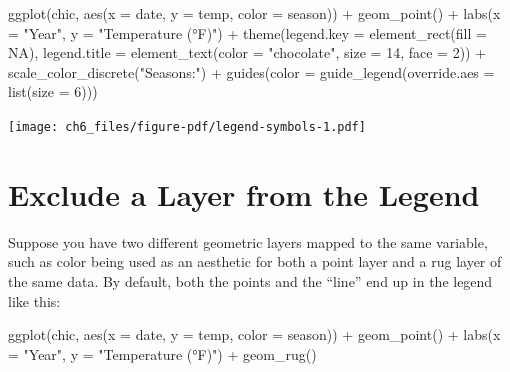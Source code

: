 \documentclass[
  letterpaper,
  DIV=11,
  numbers=noendperiod]{scrreprt}
\newenvironment{Shaded}{\begin{snugshade}}{\end{snugshade}}
\newcommand{\AttributeTok}[1]{\textcolor[rgb]{0.40,0.45,0.13}{#1}}
\newcommand{\ConstantTok}[1]{\textcolor[rgb]{0.56,0.35,0.01}{#1}}
\newcommand{\DecValTok}[1]{\textcolor[rgb]{0.68,0.00,0.00}{#1}}
\newcommand{\FunctionTok}[1]{\textcolor[rgb]{0.28,0.35,0.67}{#1}}
\newcommand{\NormalTok}[1]{\textcolor[rgb]{0.00,0.23,0.31}{#1}}
\newcommand{\SpecialCharTok}[1]{\textcolor[rgb]{0.37,0.37,0.37}{#1}}
\newcommand{\StringTok}[1]{\textcolor[rgb]{0.13,0.47,0.30}{#1}}
\begin{document}
\begin{Shaded}
\begin{Highlighting}[]
\FunctionTok{ggplot}\NormalTok{(chic, }\FunctionTok{aes}\NormalTok{(}\AttributeTok{x =}\NormalTok{ date, }\AttributeTok{y =}\NormalTok{ temp, }\AttributeTok{color =}\NormalTok{ season)) }\SpecialCharTok{+}
  \FunctionTok{geom\_point}\NormalTok{() }\SpecialCharTok{+}
  \FunctionTok{labs}\NormalTok{(}\AttributeTok{x =} \StringTok{"Year"}\NormalTok{, }\AttributeTok{y =} \StringTok{"Temperature (°F)"}\NormalTok{) }\SpecialCharTok{+}
  \FunctionTok{theme}\NormalTok{(}\AttributeTok{legend.key =} \FunctionTok{element\_rect}\NormalTok{(}\AttributeTok{fill =} \ConstantTok{NA}\NormalTok{),}
        \AttributeTok{legend.title =} \FunctionTok{element\_text}\NormalTok{(}\AttributeTok{color =} \StringTok{"chocolate"}\NormalTok{,}
                                    \AttributeTok{size =} \DecValTok{14}\NormalTok{, }\AttributeTok{face =} \DecValTok{2}\NormalTok{)) }\SpecialCharTok{+}
  \FunctionTok{scale\_color\_discrete}\NormalTok{(}\StringTok{"Seasons:"}\NormalTok{) }\SpecialCharTok{+}
  \FunctionTok{guides}\NormalTok{(}\AttributeTok{color =} \FunctionTok{guide\_legend}\NormalTok{(}\AttributeTok{override.aes =} \FunctionTok{list}\NormalTok{(}\AttributeTok{size =} \DecValTok{6}\NormalTok{)))}
\end{Highlighting}
\end{Shaded}

\texttt{[image: ch6\_files/figure-pdf/legend-symbols-1.pdf]}

\section{Exclude a Layer from the
Legend}\label{exclude-a-layer-from-the-legend}

Suppose you have two different geometric layers mapped to the same
variable, such as color being used as an aesthetic for both a point
layer and a rug layer of the same data. By default, both the points and
the ``line'' end up in the legend like this:

\begin{Shaded}
\begin{Highlighting}[]
\FunctionTok{ggplot}\NormalTok{(chic, }\FunctionTok{aes}\NormalTok{(}\AttributeTok{x =}\NormalTok{ date, }\AttributeTok{y =}\NormalTok{ temp, }\AttributeTok{color =}\NormalTok{ season)) }\SpecialCharTok{+}
  \FunctionTok{geom\_point}\NormalTok{() }\SpecialCharTok{+}
  \FunctionTok{labs}\NormalTok{(}\AttributeTok{x =} \StringTok{"Year"}\NormalTok{, }\AttributeTok{y =} \StringTok{"Temperature (°F)"}\NormalTok{) }\SpecialCharTok{+}
  \FunctionTok{geom\_rug}\NormalTok{()}
\end{Highlighting}
\end{Shaded}
\end{document}
